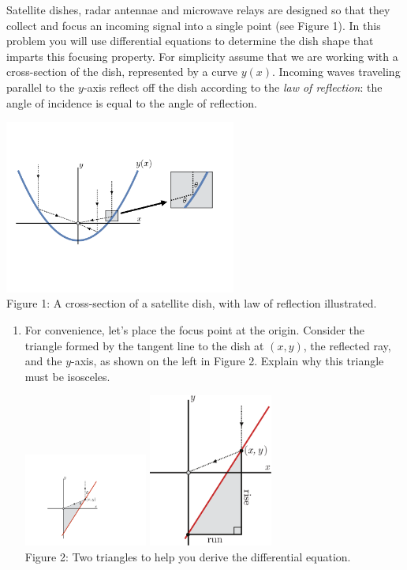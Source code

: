 \documentclass[12pt,letterpaper]{hmcpset}
\begin{document}
\begin{problem}[7]
  Satellite dishes, radar antennae and microwave relays are designed so that they collect and focus an incoming signal into a single point (see Figure 1).  In this problem you will use differential equations to determine the dish shape that imparts this focusing property.  For simplicity assume that we are working with a cross-section of the dish, represented by a curve $y(x)$.  Incoming waves traveling parallel to the $y$-axis reflect off the dish according to the {\it law of reflection}:  the angle of incidence is equal to the angle of reflection.
  	\parbox[c]{6in}{
  	\centering
  	\includegraphics[width=3.0in]{img/mar_22_7}\\
  	Figure 1: A cross-section of a satellite dish, with law of reflection illustrated.}  
  \begin{enumerate}
  	\item For convenience, let's place the focus point at the origin. Consider the triangle formed by the tangent line to the dish at $(x,y)$, the reflected ray, and the $y$-axis, as shown on the left in Figure 2. Explain why this triangle must be isosceles.
  	  \parbox[c]{5in}{
  	  	\centering
  		\includegraphics[width=1.6in]{img/mar_22_7a1}\qquad\qquad 
  		\includegraphics[width=1.6in]{img/mar_22_7a2}\\ Figure 2: Two triangles to help you derive the differential equation.}

\end{enumerate}
\end{problem}
\end{document}
